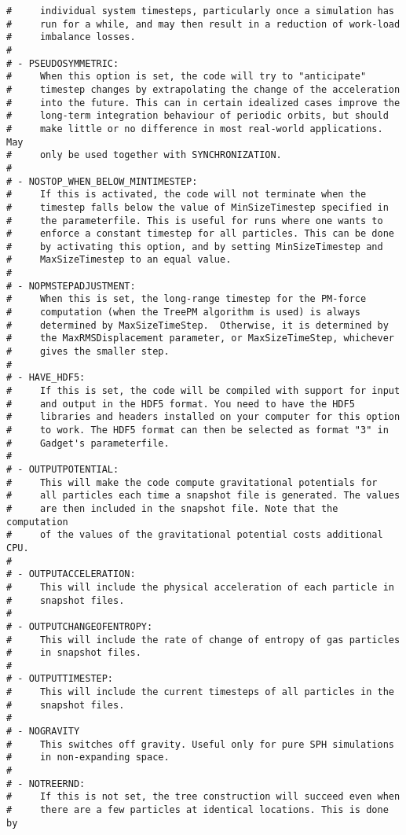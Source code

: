 \documentclass[a4paper,english,10.5pt]{scrartcl}
\begin{document}
\begin{verbatim}
#     individual system timesteps, particularly once a simulation has
#     run for a while, and may then result in a reduction of work-load
#     imbalance losses.
#
# - PSEUDOSYMMETRIC: 
#     When this option is set, the code will try to "anticipate"
#     timestep changes by extrapolating the change of the acceleration
#     into the future. This can in certain idealized cases improve the
#     long-term integration behaviour of periodic orbits, but should
#     make little or no difference in most real-world applications. May
#     only be used together with SYNCHRONIZATION.
#
# - NOSTOP_WHEN_BELOW_MINTIMESTEP: 
#     If this is activated, the code will not terminate when the
#     timestep falls below the value of MinSizeTimestep specified in
#     the parameterfile. This is useful for runs where one wants to
#     enforce a constant timestep for all particles. This can be done
#     by activating this option, and by setting MinSizeTimestep and
#     MaxSizeTimestep to an equal value.
#
# - NOPMSTEPADJUSTMENT: 
#     When this is set, the long-range timestep for the PM-force
#     computation (when the TreePM algorithm is used) is always
#     determined by MaxSizeTimeStep.  Otherwise, it is determined by
#     the MaxRMSDisplacement parameter, or MaxSizeTimeStep, whichever
#     gives the smaller step.
#
# - HAVE_HDF5:
#     If this is set, the code will be compiled with support for input
#     and output in the HDF5 format. You need to have the HDF5
#     libraries and headers installed on your computer for this option
#     to work. The HDF5 format can then be selected as format "3" in
#     Gadget's parameterfile.
#
# - OUTPUTPOTENTIAL: 
#     This will make the code compute gravitational potentials for
#     all particles each time a snapshot file is generated. The values
#     are then included in the snapshot file. Note that the computation
#     of the values of the gravitational potential costs additional CPU.
#
# - OUTPUTACCELERATION: 
#     This will include the physical acceleration of each particle in
#     snapshot files.
#
# - OUTPUTCHANGEOFENTROPY: 
#     This will include the rate of change of entropy of gas particles
#     in snapshot files.
#
# - OUTPUTTIMESTEP:  
#     This will include the current timesteps of all particles in the 
#     snapshot files.
#
# - NOGRAVITY      
#     This switches off gravity. Useful only for pure SPH simulations 
#     in non-expanding space.
#
# - NOTREERND:       
#     If this is not set, the tree construction will succeed even when
#     there are a few particles at identical locations. This is done by

\end{verbatim}
\end{document}
